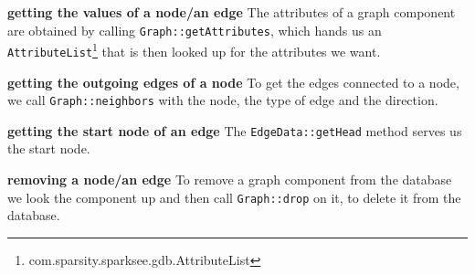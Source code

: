 \textbf{getting the values of a node/an edge} \newline
The attributes of a graph component are obtained by calling \texttt{Graph::getAttributes},
which hands us an \texttt{AttributeList}\footnote{com.sparsity.sparksee.gdb.AttributeList} that is then looked up for the attributes we want.

\textbf{getting the outgoing edges of a node} \newline
To get the edges connected to a node,
we call \texttt{Graph::neighbors} with the node, the type of edge and the direction.

\textbf{getting the start node of an edge} \newline
The \texttt{EdgeData::getHead} method serves us the start node.

\textbf{removing a node/an edge} \newline
To remove a graph component from the database we look the component up and then call \texttt{Graph::drop} on it,
to delete it from the database.
